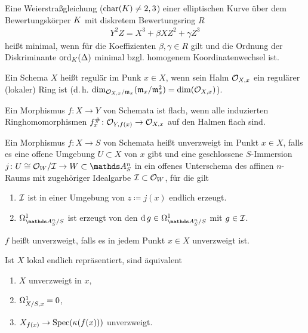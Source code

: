 \documentclass[german]{scrreprt}
\begin{document}
\begin{Definition}
  Eine Weierstraßgleichung ($\operatorname{char}(K)\neq2,3$) einer elliptischen
  Kurve über dem Bewertungskörper $K$ mit diskretem Bewertungsring $R$
  \begin{gather*}
    Y^2Z = X^3 + \beta XZ^2 + \gamma Z^3
  \end{gather*}
  heißt minimal, wenn für die Koeffizienten $\beta, \gamma\in R$ gilt
  und die Ordnung der Diskriminante $\operatorname{ord}_{K}(\Delta)$ minimal
  bzgl. homogenem Koordinatenwechsel ist.
  \cite[Chapter 1.5, S.\,22]{neron}
\end{Definition}

\begin{Definition}[Regulär]
Ein Schema $X$ heißt regulär im Punk $x\in X$, wenn sein Halm
$\mathcal{O}_{X,x}$ ein regulärer (lokaler) Ring ist
(d.\,h. $\dim_{\mathcal{O}_{X,x}/\mathfrak{m}_x}(\mathfrak{m}_x/\mathfrak{m}_x^2)=\dim(\mathcal{O}_{X,x})$).
\end{Definition}

\begin{Definition}
Ein Morphismus $f\colon X\to Y$ von Schemata ist flach, wenn alle
induzierten Ringhomomorphismen $f_x^\#\colon \mathcal{O}_{Y,f(x)}\to\mathcal{O}_{X,x}$  auf
den Halmen flach sind.
\cite[]{bosch, goodreduction}
\end{Definition}

\begin{Definition}
  Ein Morphismus $f\colon X\to S$ von Schemata heißt unverzweigt im
  Punkt $x\in X$, falls es eine offene Umgebung
  $U\subset X$ von $x$ gibt und eine geschlossene $S$-Immersion
  $j\colon U\cong\O_W/\I\to W\subset\A_S^n$ in ein offenes Unterschema
  des affinen $n$-Raums mit zugehöriger Idealgarbe $\mathcal{I}\subset\mathcal{O}_W$,
  für die gilt
  \begin{enumerate}[label=(\alph*)]
  \item $\mathcal{I}$ ist in einer Umgebung von $z\coloneqq j(x)$ endlich erzeugt.
  \item $\Om{\A_S^n/S}$ ist erzeugt von den $\d g\in\Om{\A_S^n/S}$
    mit $g\in\mathcal{I}$.
  \end{enumerate}
  $f$ heißt unverzweigt, falls es in jedem Punkt $x\in X$
  unverzweigt ist.
  \begin{Bemerkung}
    Ist $X$ lokal endlich repräsentiert, sind äquivalent
    \begin{enumerate}[label=(\roman*)]
    \item $X$ unverzweigt in $x$,
    \item $\Omega_{X/S,x}^1=0$,
    \item $X_{f(x)}\to \operatorname{Spec}(\kappa(f(x)))$ unverzweigt.
    \end{enumerate}
    \cite[8.4, Theorem 3]{bosch}
  \end{Bemerkung}
\end{Definition}
\end{document}
